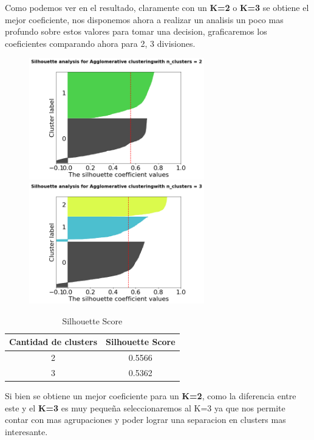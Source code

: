 \newpage
Como podemos ver en el resultado, claramente con un \textbf{K=2} o \textbf{K=3} se obtiene el mejor coeficiente, nos disponemos ahora a realizar un analisis un poco mas profundo sobre estos valores para tomar una decision, graficaremos los coeficientes comparando ahora para 2, 3 divisiones. 

\begin{figure}[h]
{\includegraphics[width = 3in]{img/imagenes/jerarquico_AF/silhouette_2.png}} 
{\includegraphics[width = 3in]{img/imagenes/jerarquico_AF/silhouette_3.png}}\\
\label{fig: Comparativa entre Silhouette}
\end{figure}

\begin{table}[H]
    \centering
    \begin{tabular}{|c|c|}
		\hline
        Cantidad de clusters & Silhouette Score \\
        \hline
        2 & 0.5566\\
        3 & 0.5362\\
        \hline
    \end{tabular}
    \caption{Silhouette Score}
    \label{tab:clus-sil}
\end{table}

Si bien se obtiene un mejor coeficiente para un \textbf{K=2}, como la diferencia entre este y el \textbf{K=3} es muy pequeña seleccionaremos al K=3 ya que nos permite contar con mas agrupaciones y poder lograr una separacion en clusters mas interesante.

